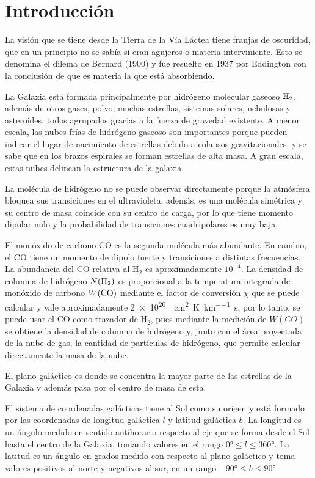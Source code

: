 \section{Introducción}

La visión que se tiene desde la Tierra de la Vía Láctea tiene franjas de oscuridad, que en un principio no se sabía si eran agujeros o materia interviniente. Esto se denomina el dilema de Bernard (1900) y fue resuelto en 1937 por Eddington con la conclusión de que es materia la que está absorbiendo.

La Galaxia está formada principalmente por hidrógeno molecular gaseoso $\textnormal{H}_2$, además de otros gases, polvo, muchas estrellas, sistemas solares, nebulosas y asteroides, todos agrupados gracias a la fuerza de gravedad existente. A menor escala, las nubes frías de hidrógeno gaseoso son importantes porque pueden indicar el lugar de nacimiento de estrellas debido a colapsos gravitacionales, y se sabe que en los brazos espirales se forman estrellas de alta masa. A gran escala, estas nubes delinean la estructura de la galaxia.

La molécula de hidrógeno no se puede observar directamente porque la atmósfera bloquea sus transiciones en el ultravioleta, además, es una molécula simétrica y su centro de masa coincide con su centro de carga, por lo que tiene momento dipolar nulo y la probabilidad de transiciones cuadripolares es muy baja.

El monóxido de carbono CO es la segunda molécula más abundante. En cambio, el CO tiene un momento de dipolo fuerte y transiciones a distintas frecuencias. La abundancia del CO relativa al H$_2$ es aproximadamente $10^{-4}$. La densidad de columna de hidrógeno $N(\textnormal{H}_2)$ es proporcional a la temperatura integrada de monóxido de carbono $W(\textnormal{CO})$ mediante el factor de conversión $\chi$ que se puede calcular y vale aproximadamente \SI{2e20}{\per\centi\metre\squared\per\kelvin\per\kilo\metre\second}, por lo tanto, se puede usar el CO como trazador de H$_2$, pues mediante la medición de $W(CO)$ se obtiene la densidad de columna de hidrógeno y, junto con el área proyectada de la nube de gas, la cantidad de partículas de hidrógeno, que permite calcular directamente la masa de la nube.

El plano galáctico es donde se concentra la mayor parte de las estrellas de la Galaxia y además pasa por el centro de masa de esta.

El sistema de coordenadas galácticas tiene al Sol como su origen y está formado por las coordenadas de longitud galáctica $l$ y latitud galáctica $b$. La longitud es un ángulo medido en sentido antihorario respecto al eje que se forma desde el Sol hasta el centro de la Galaxia, tomando valores en el rango $\ang{0}\le l\le\ang{360}$. La latitud es un ángulo en grados medido con respecto al plano galáctico y toma valores positivos al norte y negativos al sur, en un rango $\ang{-90}\le b\le\ang{90}$.

